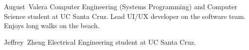 \documentclass[journal,compsoc]{IEEEtran}
\begin{document}
\begin{IEEEbiography}
{August~Valera}
  Computer Engineering (Systems Programming) and Computer Science student at UC Santa Cruz. Lead UI/UX developer on the software team. Enjoys long walks on the beach.
\end{IEEEbiography}

\begin{IEEEbiography}{Jeffrey~Zheng}
  Electrical Engineering student at UC Santa Cruz.
\end{IEEEbiography}





\end{document}
